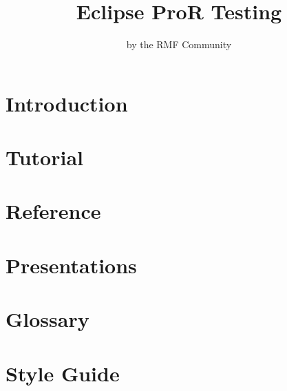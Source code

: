 \documentclass[twoside,10pt]{book}
\title{Eclipse ProR Testing}
\author{by the RMF Community}
\begin{document}
        

\maketitle

\tableofcontents

\chapter{Introduction}


\chapter{Tutorial}


\chapter{Reference}


\chapter{Presentations}


\chapter{Glossary}


\chapter{Style Guide}

\end{document}
